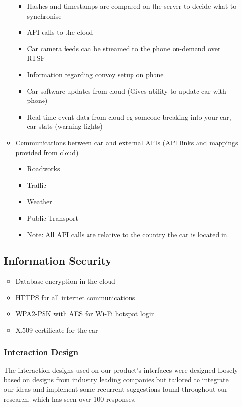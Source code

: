 \documentclass{article}
\begin{document}
\begin{itemize}
\begin{itemize}
\begin{itemize}
        	\item Hashes and timestamps are compared on the server to decide what to synchronise
            \item API calls to the cloud
            \item Car camera feeds can be streamed to the phone on-demand over RTSP
            \item Information regarding convoy setup on phone
            \item Car software updates from cloud (Gives ability to update car with phone)
            \item Real time event data from cloud eg someone breaking into your car, car stats (warning lights)
        \end{itemize}
	  \item Communications between car and external APIs (API links and mappings provided from cloud)
        \begin{itemize}
        	\item Roadworks
            \item Traffic
            \item Weather
            \item Public Transport
            \item Note: All API calls are relative to the country the car is located in.
        \end{itemize}
	\end{itemize}

\subsection{Information Security} \label{ssec:information-security}
	\begin{itemize}
		\item Database encryption in the cloud
        \item HTTPS for all internet communications
        \item WPA2-PSK with AES for Wi-Fi hotspot login
        \item X.509 certificate for the car
	\end{itemize}

\subsubsection{Interaction Design} \label{sssec:interaction-design}
The interaction designs used on our product's interfaces were designed loosely based on designs from industry leading companies but tailored to integrate our ideas and implement some recurrent suggestions found throughout our research, which has seen over 100 responses.


\end{itemize}
\end{document}
